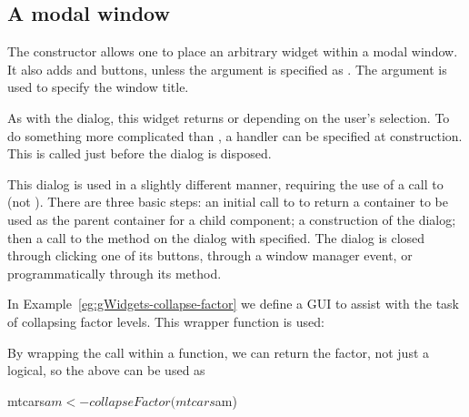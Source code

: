 \subsection{A modal window}
\label{sec:modal-window}


The  constructor allows one to place an
arbitrary widget within a modal window. It also adds  and
 buttons, unless the argument
 is specified as . The argument  is
used to specify the window title.



As with the  dialog, this widget returns
 or  depending on the user's selection. To do
something more complicated than , a handler can be
specified at construction. This is called just before the dialog is
disposed.


This dialog is used in a slightly different manner, requiring the use
of a call to  (not ).
There are three basic steps: an initial call to
 to return a container to be used as the parent
container for a child component; a construction of the dialog; then a
call to the  method on the dialog with 
specified. The dialog is closed through clicking one of its buttons,
through a window manager event, or programmatically through its
 method.

In Example~\ref{eg:gWidgets-collapse-factor} we define a GUI to assist
with the task of collapsing factor levels. This wrapper function is used:

\begin{Schunk}
\end{Schunk}

By wrapping the  call within a function, we can
return the factor, not just a logical, so the above can be used as
\begin{Schunk}
\begin{Sinput}
 mtcars$am <- collapseFactor(mtcars$am)
\end{Sinput}
\end{Schunk}



